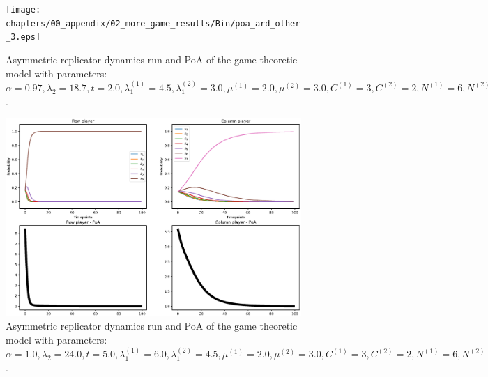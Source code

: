 \begin{figure}[H]
    \texttt{[image: chapters/00\_appendix/02\_more\_game\_results/Bin/poa\_ard\_other\_3.eps]}
    \caption{Asymmetric replicator dynamics run and PoA of the game theoretic
    model with parameters: \(\alpha = 0.97, \lambda_2 = 18.7, t = 2.0,
    \lambda_1^{(1)} = 4.5, \lambda_1^{(2)} = 3.0, \mu^{(1)} = 2.0,
    \mu^{(2)} = 3.0, C^{(1)} = 3, C^{(2)} = 2, N^{(1)} = 6, N^{(2)} = 7,
    M^{(1)} = 5, M^{(2)} = 4\).}
    \label{fig:poa_ard_other_3}
\end{figure}



\begin{figure}[H]
    \includegraphics[width=\textwidth, trim = 0 60 0 60, clip]{chapters/00_appendix/02_more_game_results/Bin/poa_ard_other_4.eps}
    \caption{Asymmetric replicator dynamics run and PoA of the game theoretic
    model with parameters: \(\alpha = 1.0, \lambda_2 = 24.0, t = 5.0,
    \lambda_1^{(1)} = 6.0, \lambda_1^{(2)} = 4.5, \mu^{(1)} = 2.0,
    \mu^{(2)} = 3.0, C^{(1)} = 3, C^{(2)} = 2, N^{(1)} = 6, N^{(2)} = 7,
    M^{(1)} = 5, M^{(2)} = 4\).}
    \label{fig:poa_ard_other_4}
\end{figure}

